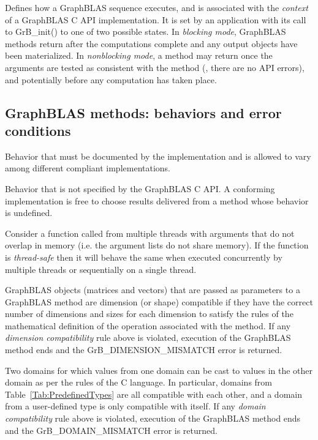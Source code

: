  Defines how a GraphBLAS sequence executes, and is associated 
with the {\it context} of a GraphBLAS C API implementation. It is set by an 
application with its call to {\sf GrB\_init()} to one of two possible states.  
In \emph{blocking mode}, GraphBLAS methods return after the computations 
complete and any output objects have been materialized.  In {\it nonblocking mode}, a 
method may return once the arguments are tested as consistent with 
the method (\ie, there are no API errors), and potentially before any computation 
has taken place.
\glossEnd


\subsection{GraphBLAS methods: behaviors and error conditions}
\glossBegin
{} Behavior that must be documented
by the implementation and is allowed to vary among different
compliant implementations. 

 Behavior that is not specified by the GraphBLAS C API.
A conforming implementation is free to choose results delivered from a method
whose behavior is undefined. 

  Consider a function called from multiple threads with 
arguments that do not overlap in memory (i.e. the argument lists do not share 
memory).  If the function is \emph{thread-safe} then it will behave the same 
when executed concurrently by multiple threads or sequentially on a single 
thread.

 GraphBLAS objects (matrices and vectors) that are
passed as parameters to a GraphBLAS method are dimension (or shape) compatible if
they have the correct number of dimensions and sizes for each dimension to satisfy 
the rules of the mathematical definition of the operation associated with the method. 
If any \emph{dimension compatibility} rule above is violated, execution of the GraphBLAS 
method ends and the {\sf GrB\_DIMENSION\_MISMATCH} error is returned.

 Two domains for which values from one domain can be 
cast to values in the other domain as per the rules of the C language. In particular, 
domains from Table~\ref{Tab:PredefinedTypes} 
are all compatible with each other, and a domain from a user-defined type is only 
compatible with itself. If any \emph{domain compatibility} rule above is 
violated, execution of the GraphBLAS method ends and the {\sf GrB\_DOMAIN\_MISMATCH} 
error is returned.
\glossEnd

